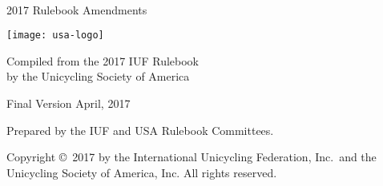 \begin{titlepage}
\centering
\ \\

{\Huge 2017 Rulebook Amendments}
\vspace{5mm}

\texttt{[image: usa-logo]}

\vspace{5mm}
{\Large Compiled from the 2017 IUF Rulebook\\ }
\vspace{3mm}
{\Large by the Unicycling Society of America}

\vspace{8mm}
{\Large Final Version \quad April, 2017}

\vspace{40mm}
Prepared by the IUF and USA Rulebook Committees.

\vspace{5mm}
{\small Copyright \copyright\ 2017 by the International Unicycling Federation, Inc.\ and the Unicycling Society of America, Inc. All rights reserved.}

\end{titlepage}
